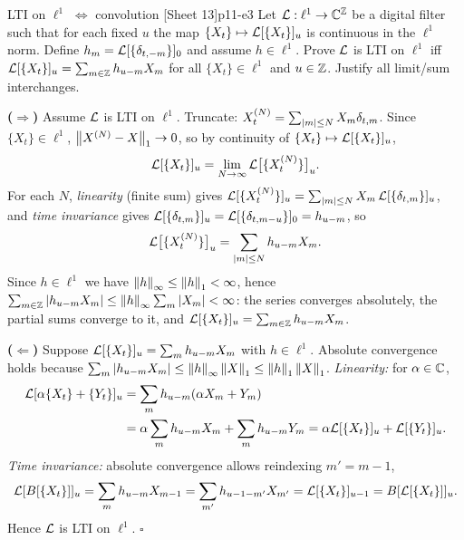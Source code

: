 \begin{exercise}{LTI on $\ell^1$ $\Leftrightarrow$ convolution \quad\textnormal{[Sheet 13]}}{p11-e3}
Let $\mathcal{L}:\ell^1\to\mathbb{C}^{\mathbb{Z}}$ be a digital filter such that for each fixed
$u$ the map $\{X_t\}\mapsto\mathcal{L}[\{X_t\}]_u$ is continuous in the $\ell^1$ norm.
Define $h_m=\mathcal{L}[\{\delta_{t,-m}\}]_0$ and assume $h\in\ell^1$. Prove $\mathcal{L}$ is
LTI on $\ell^1$ iff $\mathcal{L}[\{X_t\}]_u=\sum_{m\in\mathbb{Z}}h_{u-m}X_m$ for all
$\{X_t\}\in\ell^1$ and $u\in\mathbb{Z}$. Justify all limit/sum interchanges.
\end{exercise}
\begin{solution}
\textbf{($\Rightarrow$)} Assume $\mathcal{L}$ is LTI on $\ell^1$. Truncate:
$X^{(N)}_t=\sum_{\left\lvert m \right\rvert\le N}X_m\delta_{t,m}$. Since $\{X_t\}\in\ell^1$,
$\left\lVert X^{(N)}-X \right\rVert_1\to0$, so by continuity of
$\{X_t\}\mapsto\mathcal{L}[\{X_t\}]_u$,
\[
\mathcal{L}[\{X_t\}]_u=\lim_{N\to\infty}\mathcal{L}\big[\{X^{(N)}_t\}\big]_u .
\]
For each $N$, \emph{linearity} (finite sum) gives
$\mathcal{L}[\{X^{(N)}_t\}]_u=\sum_{\left\lvert m \right\rvert\le N}X_m\,\mathcal{L}[\{\delta_{t,m}\}]_u$, and
\emph{time invariance} gives
$\mathcal{L}[\{\delta_{t,m}\}]_u=\mathcal{L}[\{\delta_{t,m-u}\}]_0=h_{u-m}$, so
\[
\mathcal{L}\big[\{X^{(N)}_t\}\big]_u=\sum_{\left\lvert m \right\rvert\le N}h_{u-m}X_m .
\]
Since $h\in\ell^1$ we have $\left\lVert h \right\rVert_\infty\le\left\lVert h \right\rVert_1<\infty$, hence
$\sum_{m\in\mathbb{Z}}\left\lvert h_{u-m}X_m \right\rvert\le\left\lVert h \right\rVert_\infty\sum_m\left\lvert X_m \right\rvert<\infty$:
the series converges absolutely, the partial sums converge to it, and
$\mathcal{L}[\{X_t\}]_u=\sum_{m\in\mathbb{Z}}h_{u-m}X_m$.

\textbf{($\Leftarrow$)} Suppose $\mathcal{L}[\{X_t\}]_u=\sum_m h_{u-m}X_m$ with
$h\in\ell^1$. Absolute convergence holds because
$\sum_m\left\lvert h_{u-m}X_m \right\rvert\le\left\lVert h \right\rVert_\infty\left\lVert X \right\rVert_1\le\left\lVert h \right\rVert_1\left\lVert X \right\rVert_1$.
\emph{Linearity:} for $\alpha\in\mathbb{C}$,
\[
\begin{aligned}
\mathcal{L}[\alpha\{X_t\}+\{Y_t\}]_u
&=\sum_m h_{u-m}(\alpha X_m+Y_m)\\
&=\alpha\sum_m h_{u-m}X_m+\sum_m h_{u-m}Y_m
 =\alpha\mathcal{L}[\{X_t\}]_u+\mathcal{L}[\{Y_t\}]_u .
\end{aligned}
\]
\emph{Time invariance:} absolute convergence allows reindexing $m'=m-1$,
\[
\mathcal{L}[B[\{X_t\}]]_u=\sum_m h_{u-m}X_{m-1}=\sum_{m'}h_{u-1-m'}X_{m'}
=\mathcal{L}[\{X_t\}]_{u-1}=B[\mathcal{L}[\{X_t\}]]_u .
\]
Hence $\mathcal{L}$ is LTI on $\ell^1$. \hfill$\square$
\end{solution}

